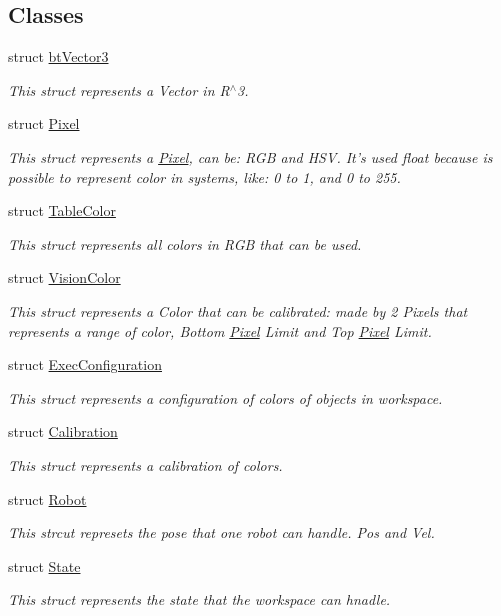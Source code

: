 \subsection*{Classes}
\begin{DoxyCompactItemize}
\item 
struct \hyperlink{structcommon_1_1btVector3}{bt\-Vector3}
\begin{DoxyCompactList}\small\item\em This struct represents a Vector in R$^\wedge$3. \end{DoxyCompactList}\item 
struct \hyperlink{structcommon_1_1Pixel}{Pixel}
\begin{DoxyCompactList}\small\item\em This struct represents a \hyperlink{structcommon_1_1Pixel}{Pixel}, can be\-: R\-G\-B and H\-S\-V. It's used float because is possible to represent color in systems, like\-: 0 to 1, and 0 to 255. \end{DoxyCompactList}\item 
struct \hyperlink{structcommon_1_1TableColor}{Table\-Color}
\begin{DoxyCompactList}\small\item\em This struct represents all colors in R\-G\-B that can be used. \end{DoxyCompactList}\item 
struct \hyperlink{structcommon_1_1VisionColor}{Vision\-Color}
\begin{DoxyCompactList}\small\item\em This struct represents a Color that can be calibrated\-: made by 2 Pixels that represents a range of color, Bottom \hyperlink{structcommon_1_1Pixel}{Pixel} Limit and Top \hyperlink{structcommon_1_1Pixel}{Pixel} Limit. \end{DoxyCompactList}\item 
struct \hyperlink{structcommon_1_1ExecConfiguration}{Exec\-Configuration}
\begin{DoxyCompactList}\small\item\em This struct represents a configuration of colors of objects in workspace. \end{DoxyCompactList}\item 
struct \hyperlink{structcommon_1_1Calibration}{Calibration}
\begin{DoxyCompactList}\small\item\em This struct represents a calibration of colors. \end{DoxyCompactList}\item 
struct \hyperlink{structcommon_1_1Robot}{Robot}
\begin{DoxyCompactList}\small\item\em This strcut represets the pose that one robot can handle. Pos and Vel. \end{DoxyCompactList}\item 
struct \hyperlink{structcommon_1_1State}{State}
\begin{DoxyCompactList}\small\item\em This struct represents the state that the workspace can hnadle. \end{DoxyCompactList}\end{DoxyCompactItemize}

